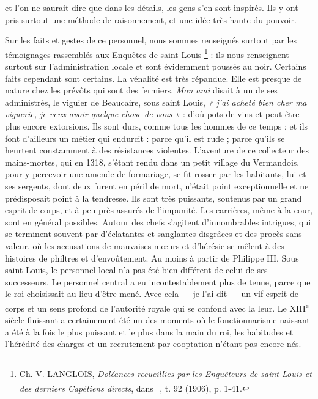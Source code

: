\documentclass[french,twoside]{book} %
\begin{document}
\label{p42} et l’on ne saurait dire que dans les détails, les gens s’en sont inspirés. Ils y ont pris surtout une méthode de raisonnement, et une idée très haute du pouvoir.\par
Sur les faits et gestes de ce personnel, nous sommes renseignés surtout par les témoignages rassemblés aux Enquêtes de saint Louis \footnote{ Ch. V. LANGLOIS, {\itshape Doléances recueillies par les Enquêteurs de saint Louis et des derniers Capétiens directs}, dans \href{http://gallica.bnf.fr/document?O=N018186}{}\footnote{\href{http://gallica.bnf.fr/document?O=N018186}{\url{http://gallica.bnf.fr/document?O=N018186}}}, t. 92 (1906), p. 1-41.} : ils nous renseignent surtout sur l’administration locale et sont évidemment poussés au noir. Certains faits cependant sont certains. La vénalité est très répandue. Elle est presque de nature chez les prévôts qui sont des fermiers. \emph{Mon ami} disait à un de ses administrés, le viguier de Beaucaire, sous saint Louis, \emph{« j’ai acheté bien cher ma viguerie, je veux avoir quelque chose de vous »} : d’où pots de vins et peut-être plus encore extorsions. Ils sont durs, comme tous les hommes de ce temps ; et ils font d’ailleurs un métier qui endurcit : parce qu’il est rude ; parce qu’ils se heurtent constamment à des résistances violentes. L’aventure de ce collecteur des mains-mortes, qui en 1318, s’étant rendu dans un petit village du Vermandois, pour y percevoir une amende de formariage, se fit rosser par les habitants, lui et ses sergents, dont deux furent en péril de mort, n’était point exceptionnelle et ne prédisposait point à la tendresse. Ils sont très puissants, soutenus par un grand esprit de corps, et à peu près assurés de l’impunité. Les carrières, même à la cour, sont en général possibles. Autour des chefs s’agitent d’innombrables intrigues, qui se terminent souvent par d’éclatantes et sanglantes disgrâces et des procès sans valeur, où les accusations de mauvaises mœurs et d’hérésie se mêlent à des histoires de philtres et d’envoûtement. Au moins à partir de Philippe III. Sous saint Louis, le personnel local n’a pas été bien différent de celui de ses successeurs. Le personnel central a eu incontestablement plus de tenue, parce que le roi choisissait au lieu d’être mené. Avec cela — je l’ai dit — un vif esprit de corps et un sens profond de l’autorité royale qui se confond avec la leur. Le XIII\textsuperscript{e} siècle finissant a certainement été un des moments où le fonctionnarisme naissant a été à la fois le plus puissant et le plus dans la main du roi, les habitudes et l’hérédité des charges et un recrutement par cooptation n’étant pas encore nés.
\end{document}
